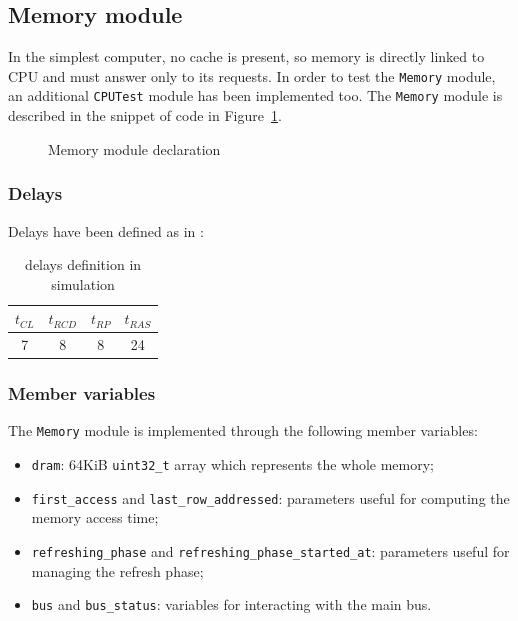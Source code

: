 \documentclass[a4paper,12pt]{article}
\begin{document}
\subsection{Memory module}
In the simplest computer, no cache is present, so memory is directly linked to CPU and must answer only to its requests.
In order to test the \texttt{Memory} module, an additional \texttt{CPUTest} module has been implemented too.
The \texttt{Memory} module is described in the snippet of code in Figure~\ref{src:memory-h}.

\begin{figure}

\caption{Memory module declaration}
\label{src:memory-h}
\end{figure}

\subsubsection{Delays}
Delays have been defined as in \cite{bib:spectek}:

\begin{table}[H]
\centering
\bgroup
\def\arraystretch{1.5}  %
\begin{tabular}{| c | c | c | c |}\hline
$t_{CL}$ & $t_{RCD}$ & $t_{RP}$ & $t_{RAS}$ \\ \hline
7 & 8 & 8 & 24 \\ \hline
\end{tabular}
\egroup
\caption{delays definition in simulation}
\end{table}

\subsubsection{Member variables}
The \texttt{Memory} module is implemented through the following member variables:

\begin{itemize}
    \item \texttt{dram}: 64KiB \texttt{uint32\_t} array which represents the whole memory;
    \item \texttt{first\_access} and \texttt{last\_row\_addressed}: parameters useful for computing the memory access time;
    \item \texttt{refreshing\_phase} and \texttt{refreshing\_phase\_started\_at}: parameters useful for managing the refresh phase;
    \item \texttt{bus} and \texttt{bus\_status}: variables for interacting with the main bus.
\end{itemize}
\end{document}
